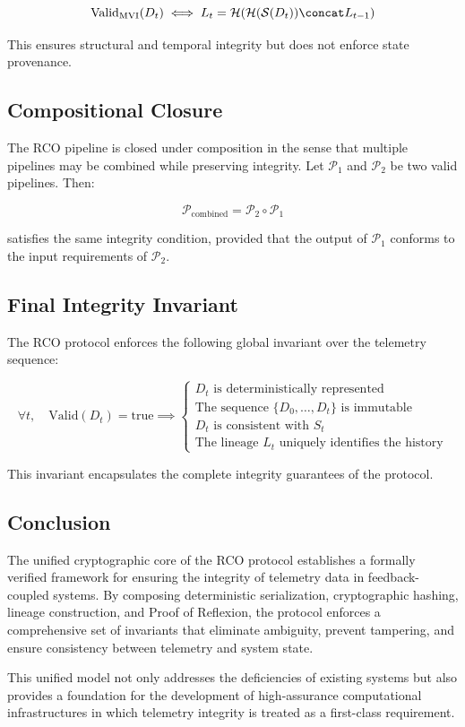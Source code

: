 \begin{equation}
\text{Valid}_{\text{MVI}}(D_t) \iff L_t = \mathcal{H}(\mathcal{H}(\mathcal{S}(D_t)) \concat L_{t-1})
\end{equation}

This ensures structural and temporal integrity but does not enforce state provenance.

\subsection{Compositional Closure}

The RCO pipeline is closed under composition in the sense that multiple pipelines may be combined while preserving integrity. Let $\mathcal{P}_1$ and $\mathcal{P}_2$ be two valid pipelines. Then:

\begin{equation}
\mathcal{P}_{\text{combined}} = \mathcal{P}_2 \circ \mathcal{P}_1
\end{equation}

satisfies the same integrity condition, provided that the output of $\mathcal{P}_1$ conforms to the input requirements of $\mathcal{P}_2$.

\subsection{Final Integrity Invariant}

The RCO protocol enforces the following global invariant over the telemetry sequence:

\begin{equation}
\forall t, \quad \text{Valid}(D_t) = \text{true} \implies
\begin{cases}
D_t \text{ is deterministically represented} \\
\text{The sequence } \{D_0, \dots, D_t\} \text{ is immutable} \\
D_t \text{ is consistent with } S_t \\
\text{The lineage } L_t \text{ uniquely identifies the history}
\end{cases}
\end{equation}

This invariant encapsulates the complete integrity guarantees of the protocol.

\subsection{Conclusion}

The unified cryptographic core of the RCO protocol establishes a formally verified framework for ensuring the integrity of telemetry data in feedback-coupled systems. By composing deterministic serialization, cryptographic hashing, lineage construction, and Proof of Reflexion, the protocol enforces a comprehensive set of invariants that eliminate ambiguity, prevent tampering, and ensure consistency between telemetry and system state.

This unified model not only addresses the deficiencies of existing systems but also provides a foundation for the development of high-assurance computational infrastructures in which telemetry integrity is treated as a first-class requirement.